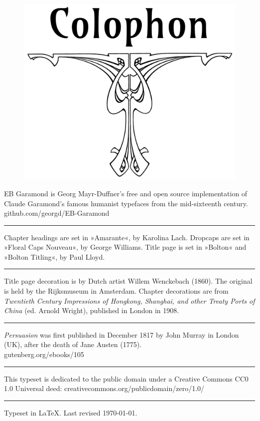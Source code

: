\documentclass[
paper=5.5in:8.5in,
BCOR=7mm,
twoside,
DIV=calc,
11pt,
usegeometry,
chapterprefix,
headings=big,
numbers=noenddot,
listof=flat,
listof=nochaptergap]{scrbook}
\begin{document}


{}
\chapter*{}
\begin{figure}[t!]
\centering
\includegraphics[width=0.5\linewidth]{colophon}
\end{figure}

\centering
EB Garamond is Georg Mayr-Duffner's free and open source implementation of Claude Garamond’s famous humanist typefaces from the mid-sixteenth century.\\github.com/georgd/EB-Garamond


\rule{0.5\textwidth}{.4pt}

Chapter headings are set in »Amarante«, by Karolina Lach. Dropcaps are set in »Floral Caps Nouveau«, by George Williams. Title page is set in »Bolton« and »Bolton Titling«, by Paul Lloyd.

\rule{0.5\textwidth}{.4pt}

Title page decoration is by Dutch artist Willem Wenckebach (1860). The original is held by the Rijksmuseum in Amsterdam. Chapter decorations are from \textit{Twentieth Century Impressions of Hongkong, Shanghai, and other Treaty Ports of China} (ed. Arnold Wright), published in London in 1908.

\rule{0.5\textwidth}{.4pt}

\textit{Persuasion} was first published in December 1817 by John Murray in London (UK), after the death of Jane Austen (1775).\\gutenberg.org/ebooks/105

\rule{0.5\textwidth}{.4pt}

This typeset is dedicated to the public domain under a Creative Commons CC0 1.0 Universal deed: creativecommons.org/publicdomain/zero/1.0/\\

\rule{0.5\textwidth}{.4pt}

Typeset in \LaTeX{}. Last revised \today.
\thispagestyle{empty}
\end{document}
